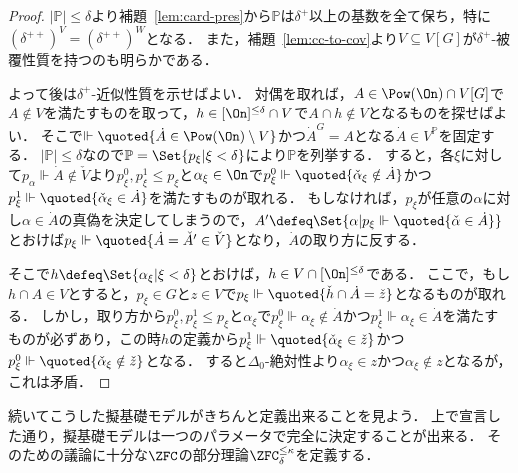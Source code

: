 \documentclass[a4j,leqno]{ltjsarticle}
\theoremstyle{nonumberplain}
\begin{document}
\begin{proof}
 $|\mathbb{P}| \leq \delta$より補題~\ref{lem:card-pres}から$\mathbb{P}$は$\delta^+$以上の基数を全て保ち，特に$(\delta^{++})^V = (\delta^{++})^W$となる．
 また，補題~\ref{lem:cc-to-cov}より$V \subseteq V[G]$が$\delta^+$-被覆性質を持つのも明らかである．

 よって後は$\delta^+$-近似性質を示せばよい．
 対偶を取れば，$A \in \Pow(\On) \cap V[G]$で$A \notin V$を満たすものを取って，$h \in [\On]^{\leq \delta} \cap V$で$A \cap h \notin V$となるものを探せばよい．
 そこで$\Vdash \quoted{\dot{A} \in \Pow(\On) \setminus V}$かつ$\dot{A}^G = A$となる$\dot{A} \in V^{\mathbb{P}}$を固定する．
 $|\mathbb{P}| \leq \delta$なので$\mathbb{P} = \Set{p_\xi | \xi < \delta}$により$\mathbb{P}$を列挙する．
 すると，各$\xi$に対して$p_\alpha \Vdash \dot{A} \notin \check{V}$より$p_\xi^0, p_\xi^1 \leq p_\xi$と$\alpha_\xi \in \On$で$p_\xi^0 \Vdash\quoted{ \check{\alpha}_\xi \notin \dot{A}}$かつ$p_\xi^1 \Vdash \quoted{\check{\alpha}_\xi \in \dot{A}}$を満たすものが取れる．
 もしなければ，$p_\xi$が任意の$\alpha$に対し$\alpha \in \dot{A}$の真偽を決定してしまうので，$A' \defeq \Set{ \alpha | p_\xi \Vdash \quoted{\check{\alpha} \in \dot{A}}}$とおけば$p_\xi \Vdash \quoted{\dot{A} = \check{A}' \in \check{V}}$となり，$\dot{A}$の取り方に反する．

 そこで$h \defeq \Set{\alpha_\xi | \xi < \delta}$とおけば，$h \in V \cap [\On]^{\leq \delta}$である．
 ここで，もし$h \cap A \in V$とすると，$p_\xi \in G$と$z \in V$で$p_\xi \Vdash \quoted{\check{h} \cap \dot{A} = \check{z}}$となるものが取れる．
 しかし，取り方から$p_\xi^0, p_\xi^1 \leq p_\xi$と$\alpha_\xi$で$p_\xi^0 \Vdash \alpha_\xi \notin \dot{A}$かつ$p_\xi^1 \Vdash \alpha_\xi \in \dot{A}$を満たすものが必ずあり，この時$h$の定義から$p_\xi^1 \Vdash \quoted{\check{\alpha}_\xi \in \check{z}}$かつ$p_\xi^0 \Vdash \quoted{\check{\alpha}_\xi \notin \check{z}}$となる．
 すると$\Delta_0$-絶対性より$\alpha_\xi \in z$かつ$\alpha_\xi \notin z$となるが，これは矛盾．
\end{proof}
続いてこうした擬基礎モデルがきちんと定義出来ることを見よう．
上で宣言した通り，擬基礎モデルは一つのパラメータで完全に決定することが出来る．
そのための議論に十分な$\ZFC$の部分理論$\ZFC_\delta^{\leq \kappa}$を定義する．
\end{document}
